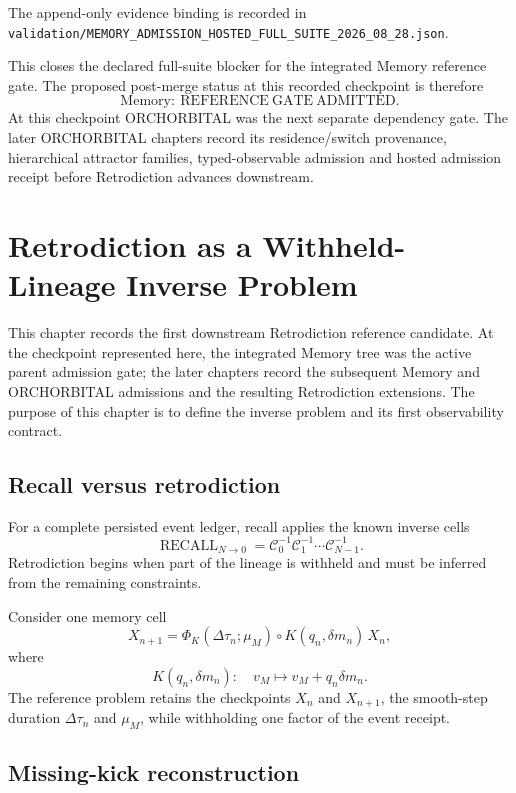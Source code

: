 The append-only evidence binding is recorded in
\texttt{validation/MEMORY\_ADMISSION\_HOSTED\_FULL\_SUITE\_2026\_08\_28.json}.

This closes the declared full-suite blocker for the integrated Memory reference gate. The proposed post-merge status at this recorded checkpoint is therefore
\[
\boxed{\mathrm{Memory}:\ \mathrm{REFERENCE\ GATE\ ADMITTED}.}
\]
At this checkpoint ORCHORBITAL was the next separate dependency gate. The later ORCHORBITAL chapters record its residence/switch provenance, hierarchical attractor families, typed-observable admission and hosted admission receipt before Retrodiction advances downstream.


\chapter{Retrodiction as a Withheld-Lineage Inverse Problem}

This chapter records the first downstream Retrodiction reference candidate. At the checkpoint represented here, the integrated Memory tree was the active parent admission gate; the later chapters record the subsequent Memory and ORCHORBITAL admissions and the resulting Retrodiction extensions. The purpose of this chapter is to define the inverse problem and its first observability contract.

\section{Recall versus retrodiction}

For a complete persisted event ledger, recall applies the known inverse cells
\[
\operatorname{RECALL}_{N\to0}
=\mathcal C_0^{-1}\mathcal C_1^{-1}\cdots\mathcal C_{N-1}^{-1}.
\]
Retrodiction begins when part of the lineage is withheld and must be inferred from the remaining constraints.

Consider one memory cell
\[
X_{n+1}
=\Phi_K(\Delta\tau_n;\mu_M)
\circ K(q_n,\delta m_n)
\,X_n,
\]
where
\[
K(q_n,\delta m_n):
\quad v_M\mapsto v_M+q_n\delta m_n.
\]
The reference problem retains the checkpoints \(X_n\) and \(X_{n+1}\), the smooth-step duration \(\Delta\tau_n\) and \(\mu_M\), while withholding one factor of the event receipt.

\section{Missing-kick reconstruction}

